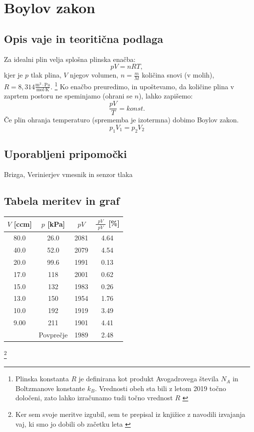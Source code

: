 \documentclass[12pt]{article}
\begin{document}
\newpage
\section{Boylov zakon} 
	\subsection*{Opis vaje in teoritična podlaga}
	Za idealni plin velja splošna plinska enačba:
	\begin{equation}
		pV = nRT,
	\end{equation}
	kjer je $p$ tlak plina, $V$ njegov volumen, $n = \frac{m}{M}$ količina snovi (v molih),
	$R = 8,314 \frac{\text{m}^3 \cdot \text{Pa}}{\text{mol} \cdot \text{K}}$.
	\footnote{Plinska konstanta $R$ je definirana kot produkt Avogadrovega števila $N_A$ 
	in Boltzmanove konstante $k_B$. Vrednosti obeh sta bili z letom 2019 točno določeni, zato
	lahko izračunamo tudi točno vrednost $R$ \cite{redef}} Ko enačbo preuredimo, in upoštevamo, da količine
	plina v zaprtem postoru ne speminjamo (ohrani se $n$), lahko zapišemo:
	\begin{equation}
			\frac{pV}{T} = konst.
	\end{equation}
	Če plin ohranja temperaturo (sprememba je izotermna) dobimo Boylov zakon.
	\begin{equation}
		p_1 V_1 = p_2 V_2
		\label{boyle}
	\end{equation}

	\subsection*{Uporabljeni pripomočki}
	Brizga, Verinierjev vmesnik in senzor tlaka
	\subsection*{Tabela meritev in graf}
	\begin{table}[h!] 
		\centering
		\begin{tabular}{|c|c|c|c|}
		\hline
		$V$ [ccm] 	& $p$ [kPa] & $pV$ 	& $\frac{pV}{\enspace \overline{pV} \enspace}$ [\%] 	\\ \hline
		80.0 		& 26.0 		& 2081 	& 4.64 													\\ \hline
		40.0 		& 52.0 		& 2079 	& 4.54 													\\ \hline
		20.0 		& 99.6 		& 1991 	& 0.13 													\\ \hline
		17.0 		& 118 		& 2001 	& 0.62 													\\ \hline
		15.0 		& 132 		& 1983 	& 0.26 													\\ \hline
		13.0 		& 150 		& 1954 	& 1.76 													\\ \hline
		10.0 		& 192 		& 1919 	& 3.49 													\\ \hline
		9.00 		& 211 		& 1901 	& 4.41 													\\ \hline
		\enspace 	& Povprečje & 1989 	& 2.48 													\\ \hline
		\end{tabular}
	\end{table} \footnote{Ker sem svoje meritve izgubil, sem te prepisal iz knjižice z navodili
	izvajanja vaj, ki smo jo dobili ob začetku leta \cite{vaje}}
\end{document}
